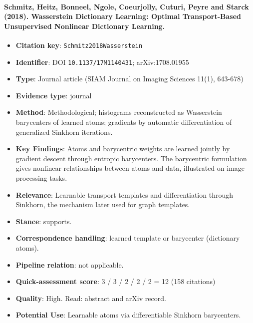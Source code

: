 \documentclass[journal,onecolumn]{IEEEtran}
\begin{document}
\paragraph{Schmitz, Heitz, Bonneel, Ngole, Coeurjolly, Cuturi, Peyre and Starck (2018). Wasserstein Dictionary Learning: Optimal Transport-Based Unsupervised Nonlinear Dictionary Learning.~\cite{Schmitz2018Wasserstein}}\mbox{}

\begin{itemize}

\item{} \textbf{Citation key}: \texttt{Schmitz2018Wasserstein}

\item{} \textbf{Identifier}: DOI \nolinkurl{10.1137/17M1140431}; arXiv:1708.01955

\item{} \textbf{Type}: Journal article (SIAM Journal on Imaging Sciences 11(1), 643-678)

\item{} \textbf{Evidence type}: journal

\item{} \textbf{Method}: Methodological; histograms reconstructed as Wasserstein barycenters of learned atoms; gradients by automatic differentiation of generalized Sinkhorn iterations.

\item{} \textbf{Key Findings}: Atoms and barycentric weights are learned jointly by gradient descent through entropic barycenters. The barycentric formulation gives nonlinear relationships between atoms and data, illustrated on image processing tasks.

\item{} \textbf{Relevance}: Learnable transport templates and differentiation through Sinkhorn, the mechanism later used for graph templates.

\item{} \textbf{Stance}: supports.

\item{} \textbf{Correspondence handling}: learned template or barycenter (dictionary atoms).

\item{} \textbf{Pipeline relation}: not applicable.

\item{} \textbf{Quick-assessment score}: 3 / 3 / 2 / 2 / 2 = 12 (158 citations)

\item{} \textbf{Quality}: High. Read: abstract and arXiv record.

\item{} \textbf{Potential Use}: Learnable atoms via differentiable Sinkhorn barycenters.

\end{itemize}
\end{document}
